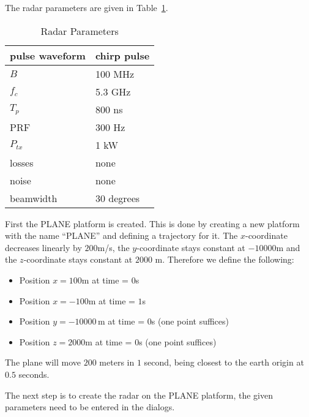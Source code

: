 The radar parameters are given in Table~\ref{tab:three}.

\begin{table}[tbp] \centering%
\begin{tabular}{|l|l|}
\hline
pulse waveform & chirp pulse \\ \hline
$B$ & 100 MHz \\ \hline
$f_{c}$ & 5.3 GHz \\ \hline
$T_{p}$ & 800 ns \\ \hline
PRF & 300 Hz \\ \hline
$P_{tx}$ & 1 kW \\ \hline
losses & none \\ \hline
noise & none \\ \hline
beamwidth & 30 degrees \\ \hline
\end{tabular}
\caption{Radar Parameters\label{tab:three}}%
\end{table}%

First the PLANE platform is created. This is done by creating a new platform
with the name ``PLANE'' and defining a trajectory for it. The $x$-coordinate
decreases linearly by $200$\thinspace m/s, the $y$-coordinate stays constant
at $-10000$\thinspace m and the $z$-coordinate stays constant at $2000$%
\thinspace m. Therefore we define the following:

\begin{itemize}
\item  Position $x=100$\thinspace m at time = $0$\thinspace s

\item  Position $x=-100$\thinspace m at time = $1$\thinspace s

\item  Position $y=-10000\,$m at time = $0$\thinspace s (one point suffices)

\item  Position $z=2000$\thinspace m at time = $0$\thinspace s (one point
suffices)
\end{itemize}

The plane will move $200$ meters in $1$ second, being closest to the earth
origin at $0.5$ seconds.

The next step is to create the radar on the PLANE platform, the given
parameters need to be entered in the dialogs.


